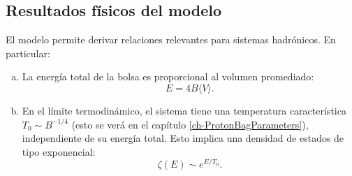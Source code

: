\subsection*{Resultados físicos del modelo}

El modelo permite derivar relaciones relevantes para sistemas hadrónicos. En particular:

\begin{enumerate}[a)]
    \item La energía total de la bolsa es proporcional al volumen promediado:  
    \[
    E = 4B \langle V \rangle.
    \]
    
    \item En el límite termodinámico, el sistema tiene una temperatura característica \( T_0 \sim B^{-1/4} \) (esto se verá en el capítulo \ref{ch-ProtonBagParameters}), independiente de su energía total. Esto implica una densidad de estados de tipo exponencial:
    \[
    \zeta(E) \sim e^{E/T_0}.
    \]
\end{enumerate}

\blankpage